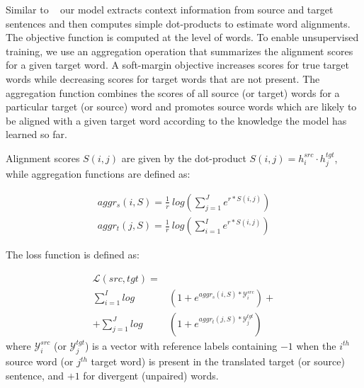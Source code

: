 \documentclass[11pt,a4paper]{article}
\begin{document}

Similar to ~\cite{W16-2207} our model extracts context information from source and target sentences and then computes simple dot-products to estimate word alignments. The objective function is computed at the level of words. 
To enable unsupervised training, we use an aggregation operation that summarizes the alignment scores for a given target word. A soft-margin objective increases scores for true target words while decreasing scores for target words that are not present.
The aggregation function combines the scores of all source (or target) words for a particular target (or source) word and promotes source words which are likely to be aligned with a given target word according to the knowledge the model has learned so far.

Alignment scores $S(i,j)$ are given by the dot-product $S(i,j) = h_i^{src} \cdotp h_j^{tgt}$, while aggregation functions are defined as:

\begin{equation}
\begin{split}
    aggr_s(i,S) = \frac{1}{r} \ log \left( \displaystyle \sum_{j=1}^{J} e^{r * S(i,j)}\right) \\
    aggr_t(j,S) = \frac{1}{r} \ log \left( \displaystyle \sum_{i=1}^{I} e^{r * S(i,j)}\right)
\end{split}
\label{aggregation}
\end{equation}

The loss function is defined as:

\begin{equation}
\begin{split}
\mathcal{L}(src,tgt) = & \\
    \sum_{i=1}^I log&\left(1+e^{aggr_{s}(i,S) * \mathcal{Y}_i^{src}}\right) +\\
 + \sum_{j=1}^J log&\left(1+e^{aggr_{t}(j,S) * \mathcal{Y}_j^{tgt}}\right)
\end{split}
\label{loss_wemb}
\end{equation}
\noindent where $\mathcal{Y}_i^{src}$ (or $\mathcal{Y}_j^{tgt}$) is a vector with reference labels containing $-1$ when the $i^{th}$ source word (or $j^{th}$ target word) is present in the translated target (or source) sentence, and $+1$ for divergent (unpaired) words. 
\end{document}

